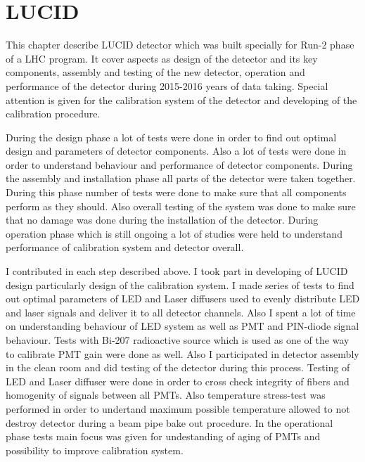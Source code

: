 \chapter{LUCID}
\label{chap:LUCID}


This chapter describe LUCID detector which was built specially for Run-2 phase of a LHC program.
It cover aspects as design of the detector and its key components, assembly and testing of the new detector, 
operation and performance of the detector during 2015-2016 years of data taking.
Special attention is given for the calibration system of the detector and developing of the calibration procedure.

During the design phase a lot of tests were done in order to find out optimal design and parameters of detector components.
Also a lot of tests were done in order to understand behaviour and performance of detector components.
During the assembly and installation phase all parts of the detector were taken together. During this phase number of tests were done
to make sure that all components perform as they should.
Also overall testing of the system was done to make sure that no damage was done during the installation of the detector.
During operation phase which is still ongoing a lot of studies were held to understand performance of calibration system and detector overall.

I contributed in each step described above. I took part in developing of LUCID design particularly design of the calibration system. 
I made series of tests to find out optimal parameters of LED and Laser diffusers used to evenly distribute LED and laser signals and deliver it to all detector 
channels. 
Also I spent a lot of time on understanding behaviour of LED system as well as PMT and PIN-diode signal behaviour.
Tests with Bi-207 radioactive source which is used as one of the way to calibrate PMT gain were done as well.
Also I participated in detector assembly in the clean room and did testing of the detector during this process.
Testing of LED and Laser diffuser were done in order to cross check integrity of fibers and homogenity of signals between all PMTs.
Also temperature stress-test was performed in order to undertand maximum possible temperature allowed to not destroy detector during a beam pipe bake out 
procedure.
In the operational phase tests main focus was given for undestanding of aging of PMTs and possibility to improve calibration system.

